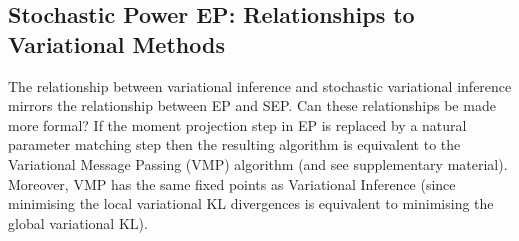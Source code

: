 \subsection{Stochastic Power EP: Relationships to Variational Methods}
%
The relationship between variational inference and stochastic variational inference \cite{hoffman:svi} mirrors the relationship between EP and SEP. 
%
Can these relationships be made more formal? If the moment projection step in EP is replaced by a natural parameter matching step then the resulting algorithm is equivalent to the Variational Message Passing (VMP) algorithm \cite{minka:divergence} (and see supplementary material). Moreover, VMP has the same fixed points as Variational Inference \cite{winn:vmp} (since minimising the local variational KL divergences is equivalent to minimising the global variational KL). 


%

